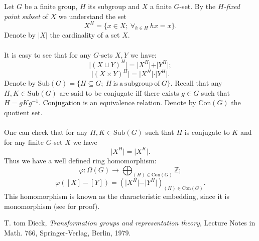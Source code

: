 \documentclass[12pt]{article}
\begin{document}
Let $G$ be a finite group, $H$ its subgroup and $X$ a finite $G$-set. By the $H$\textit{-fixed point subset} of $X$ we understand the set $$X^{H}=\{x\in X;\ \forall_{h\in H}\ hx=x\}.$$
Denote by $\vert X\vert$ the cardinality of a set $X$.\\ \\
It is easy to see that for any $G$-sets $X,Y$ we have:
$$\vert (X\sqcup Y)^{H}\vert =\vert X^{H}\vert +\vert Y^{H}\vert ;$$
$$\vert (X\times Y)^{H}\vert =\vert X^{H}\vert\cdot\vert Y^{H}\vert.$$
Denote by $\mathrm{Sub}(G)=\{H\subseteq G;\ H\ \mathrm{is}\ \mathrm{a}\ \mathrm{subgroup}\ \mathrm{of}\ G\}$. Recall that any $H,K\in\mathrm{Sub}(G)$ are said to be conjugate iff there exists $g\in G$ such that $H=gKg^{-1}$. Conjugation is an equivalence relation. Denote by $\mathrm{Con}(G)$ the quotient set.\\ \\
One can check that for any $H,K\in\mathrm{Sub}(G)$ such that $H$ is conjugate to $K$ and for any finite $G$-set $X$ we have
$$\vert X^{H}\vert = \vert X^{K}\vert.$$
Thus we have a well defined ring homomorphism:
$$\varphi:\Omega(G)\rightarrow\bigoplus_{(H)\in\mathrm{Con}(G)}\mathbb{Z};$$
$$\varphi([X]-[Y])=(\vert X^{H}\vert - \vert Y^{H}\vert)_{(H)\in\mathrm{Con}(G)}.$$
This homomorphism is known as the characteristic embedding, since it is monomorphism (see \cite{T} for proof).\\[20pt]
\begin{thebibliography}{1}
 T. tom Dieck, {\it Transformation groups and representation theory}, Lecture Notes in Math. 766, Springer-Verlag, Berlin, 1979.
\end{thebibliography}


\end{document}
